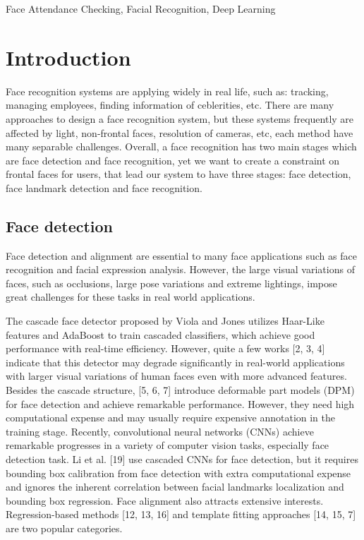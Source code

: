\documentclass[journal, twocolumn]{IEEEtran}
\begin{document}
\begin{IEEEkeywords}
Face Attendance Checking, Facial Recognition, Deep Learning
\end{IEEEkeywords}


\IEEEpeerreviewmaketitle


\section{Introduction}
\label{introduction}

Face recognition systems are applying widely in real life, such as: tracking, managing employees, finding information of ceblerities, etc. There are many approaches to design a face recognition system, but these systems frequently are affected by light, non-frontal faces, resolution of cameras, etc, each method have many separable challenges. Overall, a face recognition has two main stages which are face detection and face recognition, yet we want to create a constraint on frontal faces for users, that lead our system to have three stages: face detection, face landmark detection and face recognition.  


\subsection{Face detection}
Face detection and alignment are essential to many face applications such as face recognition and facial expression analysis. However, the large visual variations of faces, such as occlusions, large pose variations and extreme lightings, impose
great challenges for these tasks in real world applications.

The cascade face detector proposed by Viola and Jones \cite{ref:detect-1} utilizes Haar-Like features and AdaBoost to train cascaded classifiers, which achieve good performance with real-time
efficiency. However, quite a few works [2, 3, 4] indicate that this detector may degrade significantly in real-world applications with larger visual variations of human faces even with more advanced features. Besides the cascade structure, [5, 6, 7] introduce deformable part models (DPM) for face detection and achieve remarkable performance. However, they need high computational expense and may usually require expensive annotation in the training stage. Recently, convolutional neural networks (CNNs) achieve remarkable progresses in a variety of computer vision tasks, especially face detection task. Li et al. [19] use cascaded CNNs for face detection, but it requires bounding box calibration from face detection with extra computational expense and ignores the inherent correlation between facial landmarks localization and bounding box regression. Face alignment also attracts extensive interests. Regression-based methods [12, 13, 16] and template fitting approaches [14, 15, 7] are two popular categories.
\end{document}

